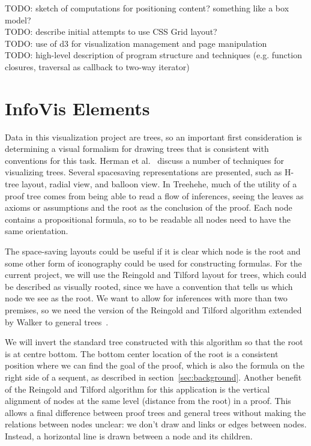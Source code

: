 \documentclass[conference]{IEEEtran}
\newcommand{\projectname}{Treehehe}
\begin{document}
TODO: sketch of computations for positioning content? something like a box model? \\

TODO: describe initial attempts to use CSS Grid layout? \\

TODO: use of d3 for visualization management and page manipulation \\

TODO: high-level description of program structure and techniques (e.g. function closures, traversal as callback to two-way iterator) \\


\section{InfoVis Elements}
\label{sec:infoviselem}

Data in this visualization project are trees, so an important first consideration is determining a visual formalism for drawing trees that is consistent with conventions for this task. Herman et al.~\cite{graphvis-herman+melancon+marshall} discuss a number of techniques for visualizing trees. Several spacesaving representations are presented, such as H-tree layout, radial view, and balloon view. In \projectname{}, much of the utility of a proof tree comes from being able to read a flow of inferences, seeing the leaves as axioms or assumptions and the root as the conclusion of the proof. Each node contains a propositional formula, so to be readable all nodes need to have the same orientation.

The space-saving layouts could be useful if it is clear which node is the root and some other form of iconography could be used for constructing formulas. For the current project, we will use the Reingold and Tilford layout for trees, which could be described as visually rooted, since we have a convention that tells us which node we see as the root. We want to allow for inferences with more than two premises, so we need the version of the Reingold and Tilford algorithm extended by Walker to general trees~\cite{generaltreeslayout-walker}.

We will invert the standard tree constructed with this algorithm so that the root is at centre bottom. The bottom center location of the root is a consistent position where we can find the goal of the proof, which is also the formula on the right side of a sequent, as described in section~\ref{sec:background}. Another benefit of the Reingold and Tilford algorithm for this application is the vertical alignment of nodes at the same level (distance from the root) in a proof. This allows a final difference between proof trees and general trees without making the relations between nodes unclear: we don't draw and links or edges between nodes. Instead, a horizontal line is drawn between a node and its children.
\end{document}
